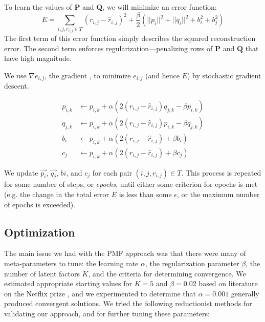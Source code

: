 \documentclass[11pt]{amsart}
\newcommand{\mat}[1]{\mathbf{#1}}
\begin{document}
To learn the values of $\mat{P}$ and $\mat{Q}$, we will minimize an error function:
$$E = \sum_{i,j,r_{i,j} \in T} \left(r_{i,j} - \hat{r}_{i,j}\right)^2 + \frac{\beta}{2} \left( ||p_i||^2 + ||q_i||^2 + b_i^2 + b_j^2 \right) $$
The first term of this error function simply describes the squared reconstruction error. The second term enforces regularization---penalizing rows of $\mat{P}$ and $\mat{Q}$ that have high magnitude. 

We use $\nabla e_{i,j}$, the gradient , to minimize $e_{i,j}$ (and hence $E$) by stochastic gradient descent.

\begin{align*}
p_{i,k} &\gets p_{i,k} + \alpha \left(2 \left(r_{i,j} - \hat{r}_{i,j}\right)  q_{j,k} - \beta p_{i,k} \right) \\
q_{j,k} &\gets p_{i,k} + \alpha \left(2 \left(r_{i,j} - \hat{r}_{i,j}\right)  p_{i,k} - \beta q_{j,k} \right) \\
b_{i}   &\gets p_{i,k} + \alpha \left(2 \left(r_{i,j} - \hat{r}_{i,j}\right)          + \beta b_{i}   \right) \\
c_{j}   &\gets p_{i,k} + \alpha \left(2 \left(r_{i,j} - \hat{r}_{i,j}\right)          + \beta c_{j}   \right)
\end{align*}

We update $\vec{p_i}$, $\vec{q_j}$, $b{i}$, and $c_{j}$ for each pair $(i, j, r_{i,j}) \in T$. This process is repeated for some number of steps, or \emph{epochs}, until either some criterion for epochs is met (e.g. the change in the total error $E$ is less than some $\epsilon$, or the maximum number of epochs is exceeded). 

\subsection{Optimization}
The main issue we had with the PMF approach was that there were many of meta-parameters to tune: the learning rate $\alpha$, the regularization parameter $\beta$, the number of latent factors $K$, and the criteria for determining convergence. We estimated appropriate starting values for $K = 5$ and $\beta = 0.02$ based on literature on the Netflix prize \cite{Mnih:2007wg,Ott:2008tu}, and we experimented to determine that $\alpha = 0.001$ generally produced convergent solutions. We tried the following reductionist methods for validating our approach, and for further tuning these parameters:
\end{document}
